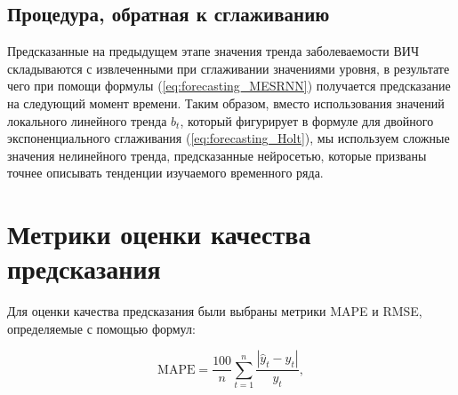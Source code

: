 \begin{table}[ht]
	\caption{Структурная схема нейросети  }
	\label{tab:NN_Summary}
\end{table}


\subsection{Процедура, обратная к сглаживанию}

Предсказанные на предыдущем этапе значения тренда заболеваемости ВИЧ складываются с извлеченными при сглаживании значениями уровня, в результате чего при помощи формулы (\ref{eq:forecasting_MESRNN}) получается предсказание на следующий момент времени. Таким образом, вместо использования значений локального линейного тренда $b_t$, который фигурирует в формуле для двойного экспоненциального сглаживания (\ref{eq:forecasting_Holt}), мы используем сложные значения нелинейного тренда, предсказанные нейросетью, которые призваны точнее описывать тенденции изучаемого временного ряда.

\section{Метрики оценки качества предсказания}

Для оценки качества предсказания были выбраны метрики MAPE и RMSE, определяемые с помощью формул:

\begin{equation}
	\text{MAPE} = \frac{100}{n} \sum_{t=1}^n \frac{\left|\hat{y}_t-y_t\right|}{y_t},
\end{equation}

